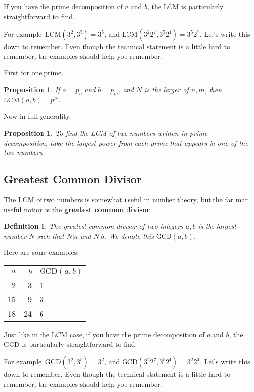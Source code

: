 \documentclass[11pt]{article}
\newtheorem{dfn}[thm]{Definition}
\newtheorem{prop}[thm]{Proposition}
\theoremstyle{definition}
\numberwithin{thm}{section}
\begin{document}
If you have the prime decomposition of $a$ and $b$, the LCM is particularly straightforward to find.

For example, $\text{LCM}(3^2, 3^5) = 3^5$, and $\text{LCM}(3^2 2^7, 3^5 2^4) = 3^5 2^7$. Let's write this down to remember. Even though the technical statement is a little hard to remember, the examples should help you remember.

First for one prime.

\begin{prop} If $a = p_n$ and $b = p_m$, and $N$ is the larger of $n,m$, then $\text{LCM}(a,b) = p^N$.
\end{prop}

Now in full generality.

\begin{prop} To find the LCM of two numbers written in prime decomposition, take the largest power from each prime that appears in one of the two numbers.
\end{prop}

\subsection{Greatest Common Divisor}

The LCM of two numbers is somewhat useful in number theory, but the far mar useful notion is the \textbf{greatest common divisor}.

\begin{dfn} The greatest common divisor of two integers $a,b$ is the largest number $N$ such that $N | a$ and $N | b$. We denote this $\text{GCD}(a,b)$.
\end{dfn}

Here are some examples:

\begin{table}[!ht]
\begin{tabular}{r|r|l}
$a$ & $b$ & $\text{GCD}(a,b)$ \\\hline
2   & 3   & 1                 \\
15  & 9   & 3                 \\
18   & 24  & 6               
\end{tabular}
\end{table}

Just like in the LCM case, if you have the prime decomposition of $a$ and $b$, the GCD is particularly straightforward to find.

For example, $\text{GCD}(3^2, 3^5) = 3^2$, and $\text{GCD}(3^2 2^7, 3^5 2^4) = 3^2 2^4$. Let's write this down to remember. Even though the technical statement is a little hard to remember, the examples should help you remember.
\end{document}
